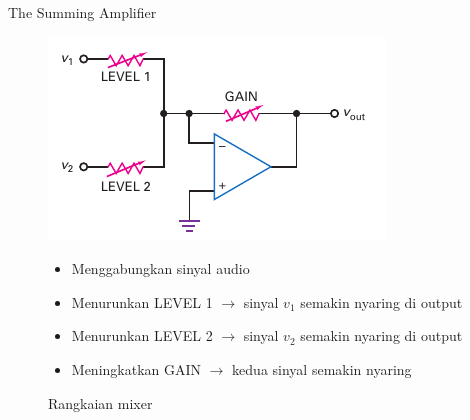 \begin{frame}{The Summing Amplifier}
	\begin{multicols}{2}
		\begin{figure}
			\centering
			\includegraphics[width=\linewidth]{gambar/fig-16.23c}
			\caption{Rangkaian mixer}
			\label{fig-16.23c}
			\columnbreak
			\begin{itemize}
				\item Menggabungkan sinyal audio
				\item Menurunkan LEVEL 1 $ \rightarrow $ sinyal $ v_1 $ semakin nyaring di output
				\item Menurunkan LEVEL 2 $ \rightarrow $ sinyal $ v_2 $ semakin nyaring di output
				\item Meningkatkan GAIN $ \rightarrow $ kedua sinyal semakin nyaring
			\end{itemize}
		\end{figure}
	\end{multicols}
\end{frame}

